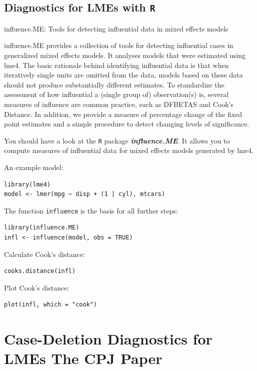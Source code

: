 \documentclass[12pt, a4paper]{article}
\theoremstyle{plain}
\theoremstyle{definition}
\theoremstyle{remark}
\begin{document}
\citet{BA83}

\subsection{Diagnostics for LMEs with \texttt{R}}
influence.ME: Tools for detecting influential data in mixed effects models

influence.ME provides a collection of tools for detecting influential cases in generalized mixed effects models. It analyses models that were estimated using lme4. The basic rationale behind identifying influential data is that when iteratively single units are omitted from the data, models based on these data should not produce substantially different estimates. To standardize the assessment of how influential a (single group of) observation(s) is, several measures of influence are common practice, such as DFBETAS and Cook's Distance. In addition, we provide a measure of percentage change of the fixed point estimates and a simple procedure to detect changing levels of significance.



You should have a look at the \texttt{R} package \textit{\textbf{influence.ME}}. It allows you to compute measures of influential data for mixed effects models generated by lme4.

An example model:
\begin{verbatim}
library(lme4)
model <- lmer(mpg ~ disp + (1 | cyl), mtcars)
\end{verbatim}

The function \texttt{influence} is the basis for all further steps:

\begin{verbatim}
library(influence.ME)
infl <- influence(model, obs = TRUE)
\end{verbatim}
Calculate Cook's distance:
\begin{verbatim}
cooks.distance(infl)
\end{verbatim}
Plot Cook's distance:
\begin{verbatim}
plot(infl, which = "cook")
\end{verbatim}
\newpage

\section{Case-Deletion Diagnostics for LMEs The CPJ Paper}%
\end{document}
